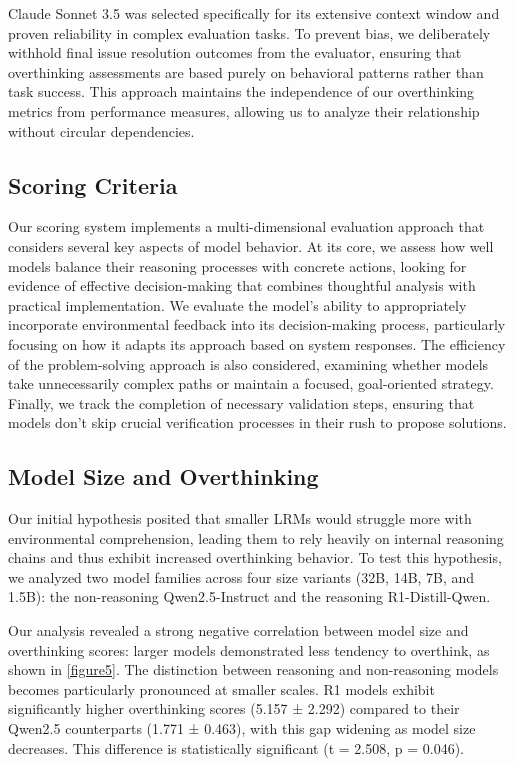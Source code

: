 Claude Sonnet 3.5 was selected specifically for its extensive context window and proven reliability in complex evaluation tasks. To prevent bias, we deliberately withhold final issue resolution outcomes from the evaluator, ensuring that overthinking assessments are based purely on behavioral patterns rather than task success. This approach maintains the independence of our overthinking metrics from performance measures, allowing us to analyze their relationship without circular dependencies.

\subsection{Scoring Criteria}
Our scoring system implements a multi-dimensional evaluation approach that considers several key aspects of model behavior. At its core, we assess how well models balance their reasoning processes with concrete actions, looking for evidence of effective decision-making that combines thoughtful analysis with practical implementation. We evaluate the model's ability to appropriately incorporate environmental feedback into its decision-making process, particularly focusing on how it adapts its approach based on system responses. The efficiency of the problem-solving approach is also considered, examining whether models take unnecessarily complex paths or maintain a focused, goal-oriented strategy. Finally, we track the completion of necessary validation steps, ensuring that models don't skip crucial verification processes in their rush to propose solutions.

\subsection{Model Size and Overthinking}
Our initial hypothesis posited that smaller LRMs would struggle more with environmental comprehension, leading them to rely heavily on internal reasoning chains and thus exhibit increased overthinking behavior. To test this hypothesis, we analyzed two model families across four size variants (32B, 14B, 7B, and 1.5B): the non-reasoning Qwen2.5-Instruct and the reasoning R1-Distill-Qwen.

Our analysis revealed a strong negative correlation between model size and overthinking scores: larger models demonstrated less tendency to overthink, as shown in \cref{figure5}. The distinction between reasoning and non-reasoning models becomes particularly pronounced at smaller scales. R1 models exhibit significantly higher overthinking scores (5.157 ± 2.292) compared to their Qwen2.5 counterparts (1.771 ± 0.463), with this gap widening as model size decreases. This difference is statistically significant (t = 2.508, p = 0.046).

